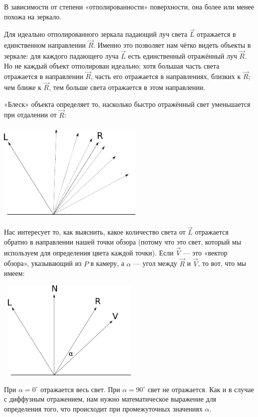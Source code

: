 В зависимости от степени «отполированности» поверхности, она более или менее похожа на зеркало.

Для идеально отполированного зеркала падающий луч света $\vec{L}$ отражается в единственном направлении $\vec{R}$. Именно это позволяет нам чётко видеть объекты в зеркале: для каждого падающего луча $\vec{L}$ есть единственный отражённый луч $\vec{R}$. Но не каждый объект отполирован идеально; хотя большая часть света отражается в направлении $\vec{R}$, часть его отражается в направлениях, близких к $\vec{R}$; чем ближе к $\vec{R}$, тем больше света отражается в этом направлении.

«Блеск» объекта определяет то, насколько быстро отражённый свет уменьшается при отдалении от $\vec{R}$:

\includegraphics[width=7cm, height=4.8cm]{light_vectors5.png}

Нас интересует то, как выяснить, какое количество света от $\vec{L}$ отражается обратно в направлении нашей точки обзора (потому что это свет, который мы используем для определения цвета каждой точки). Если $\vec{V}$ — это «вектор обзора», указывающий из $P$ в камеру, а $\alpha$ — угол между $\vec{R}$ и $\vec{V}$, то вот, что мы имеем:

\includegraphics[width=7cm, height=4.8cm]{light_vectors6.png}

При $\alpha = 0^\circ$ отражается весь свет. При $\alpha = 90^\circ$ свет не отражается. Как и в случае с диффузным отражением, нам нужно математическое выражение для определения того, что происходит при промежуточных значениях $\alpha$.

